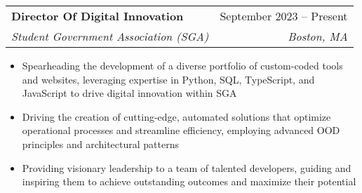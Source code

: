 \documentclass[letterpaper,11pt]{article}
\makeatletter
\newcommand{\resumeItem}[1]{
  \item\small{
    {#1 \vspace{-2pt}}
  }
}
\newcommand{\resumeSubheading}[4]{
  \vspace{-2pt}\item
    \begin{tabular*}{0.97\textwidth}[t]{l@{\extracolsep{\fill}}r}
      \textbf{#1} & #2 \\
      \textit{\small#3} & \textit{\small #4} \\
    \end{tabular*}\vspace{-7pt}
}
\newcommand{\resumeSubSubheading}[2]{
    \item
    \begin{tabular*}{0.97\textwidth}{l@{\extracolsep{\fill}}r}
      \textit{\small#1} & \textit{\small #2} \\
    \end{tabular*}\vspace{-7pt}
}
\newcommand{\resumeSubHeadingListEnd}{\end{itemize}}
\newcommand{\resumeItemListStart}{\begin{itemize}}
\newcommand{\resumeItemListEnd}{\end{itemize}\vspace{-5pt}}
\makeatother
\begin{document}
    \resumeSubheading
      {Director Of Digital Innovation}{September 2023 -- Present}
      {Student Government Association (SGA)}{Boston, MA}
      \resumeItemListStart
        \resumeItem{Spearheading the development of a diverse portfolio of custom-coded tools and websites, leveraging expertise in Python, SQL, TypeScript, and JavaScript to drive digital innovation within SGA}
        \resumeItem{Driving the creation of cutting-edge, automated solutions that optimize operational processes and streamline efficiency, employing advanced OOD principles and architectural patterns}
        \resumeItem{Providing visionary leadership to a team of talented developers, guiding and inspiring them to achieve outstanding outcomes and maximize their potential}
      \resumeItemListEnd
      


\end{document}
